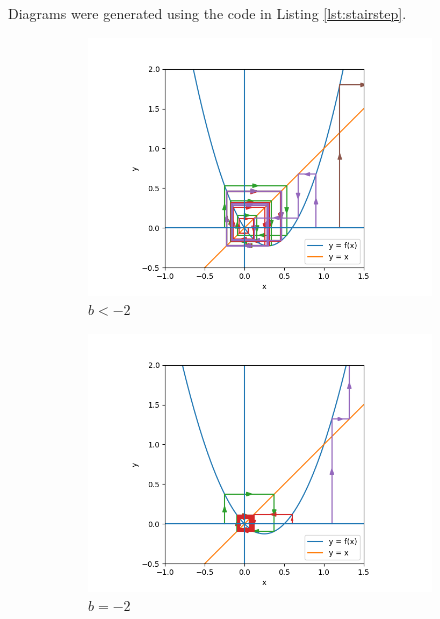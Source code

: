 \documentclass[nonumber]{homework}
\begin{document}
	Diagrams were generated using the code in Listing \ref{lst:stairstep}.
	
	\begin{figure}[h]
		\begin{subfigure}{.33\textwidth}
			\centering
			\includegraphics[width=\linewidth]{3.6 b lt -2.png}
			\caption{$b < -2$}
			\label{fig:3.6lt-2}
		\end{subfigure}
		\begin{subfigure}{.33\textwidth}
			\centering
			\includegraphics[width=\linewidth]{3.6 b eq -2.png}
			\caption{$b = -2$}
			\label{fig:3.6eq-2}
		\end{subfigure}
		\begin{subfigure}{.33\textwidth}

\end{subfigure}
\end{figure}
\end{document}
